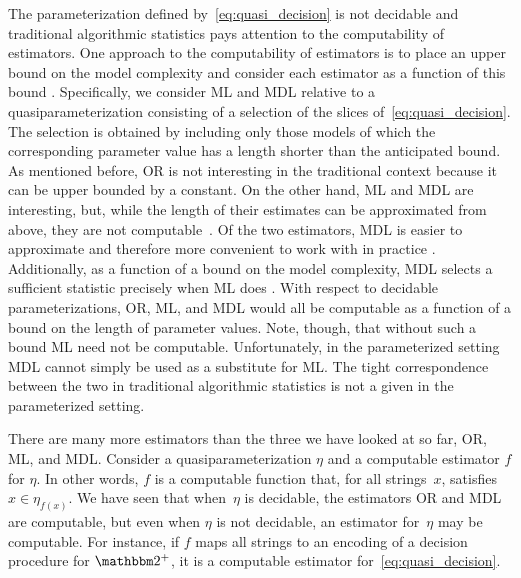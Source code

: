 The parameterization defined by~\eqref{eq:quasi_decision} is not decidable and traditional algorithmic statistics pays attention to the computability of estimators.
One approach to the computability of estimators is to place an upper bound on the model complexity and consider each estimator as a function of this bound \parencite{gacs2001algorithmic,vereshchagin2004kolmogorov} \parencite[in the presence of resource bounds][]{milovanov2017algorithmic}.
Specifically, we consider ML and MDL relative to a quasiparameterization consisting of a selection of the slices of~\eqref{eq:quasi_decision}.
The selection is obtained by including only those models of which the corresponding parameter value has a length shorter than the anticipated bound.
As mentioned before, OR is not interesting in the traditional context because it can be upper bounded by a constant.
On the other hand, ML and MDL are interesting, but, while the length of their estimates can be approximated from above, they are not computable~\parencite{vereshchagin2004kolmogorov}.
Of the two estimators, MDL is easier to approximate and therefore more convenient to work with in practice \parencite[][Section~V.B]{vereshchagin2004kolmogorov}.
Additionally, as a function of a bound on the model complexity, MDL selects a sufficient statistic precisely when ML does \parencite[][Lemma~IV.2]{vereshchagin2004kolmogorov}.
With respect to decidable parameterizations, OR, ML, and MDL would all be computable as a function of a bound on the length of parameter values.
Note, though, that without such a bound ML need not be computable.
Unfortunately, in the parameterized setting MDL cannot simply be used as a substitute for ML.
The tight correspondence between the two in traditional algorithmic statistics is not a given in the parameterized setting.

There are many more estimators than the three we have looked at so far, OR, ML, and MDL.
Consider a quasiparameterization $\eta$ and a computable estimator $f$ for $\eta$.
In other words, $f$ is a computable function that, for all strings~$x$, satisfies $x \in \eta_{f(x)}$.
We have seen that when~$\eta$ is decidable, the estimators OR and MDL are computable, but even when $\eta$ is not decidable, an estimator for~$\eta$ may be computable.
For instance, if $f$ maps all strings to an encoding of a decision procedure for $\binary^+$, it is a computable estimator for~\eqref{eq:quasi_decision}.

